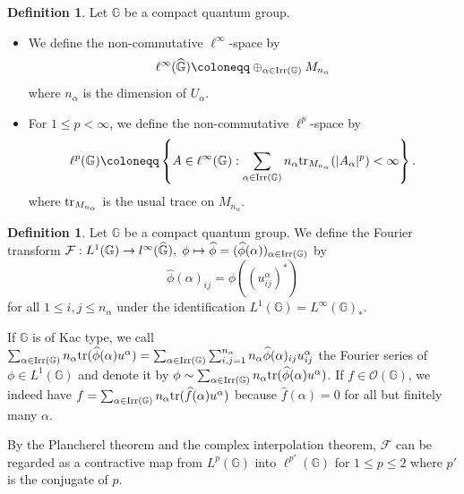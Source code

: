 \documentclass[12pt]{amsart}
\theoremstyle{plain} %
\theoremstyle{definition}
\newtheorem{definition}[equation]{Definition}
\theoremstyle{remark}
\begin{document}
\begin{definition}
Let $\mathbb{G}$ be a compact quantum group.
\begin{itemize}
 \item We define the non-commutative $\ell^{\infty}$-space by
 \[\ell^{\infty}(\widehat{\mathbb{G}})\coloneqq \oplus_{\alpha\in{\rm Irr}(\mathbb{G})} M_{n_{\alpha}}\]
 where $n_{\alpha}$ is the dimension of $U_{\alpha}$.
 \item For $1\leq p<\infty$, we define the non-commutative $\ell^p$-space by
 \[\ell^p(\mathbb{G})\coloneqq\left\{A\in \ell^{\infty}(\mathbb{G}):\sum_{\alpha\in{\rm Irr}(\mathbb{G})}n_{\alpha}{\rm tr}_{M_{n_{\alpha}}}(|A_{\alpha}|^p)<\infty\right\}.\]
 where ${\rm tr}_{M_{n_{\alpha}}}$ is the usual trace on $M_{n_{\alpha}}$.
 \end{itemize}
 \end{definition}
 
 \begin{definition}
Let $\mathbb{G}$ be a compact quantum group.
We define the Fourier transform $\mathcal{F}:L^1(\mathbb{G})\to l^{\infty}(\widehat{\mathbb{G}}),\;\phi\mapsto\widehat{\phi}=(\widehat{\phi}(\alpha))_{\alpha\in{\rm Irr}(\mathbb{G})}$ by
\[\widehat{\phi}(\alpha)_{ij}=\phi((u_{ij}^{\alpha})^*)\]
for all $1\leq i,j\leq n_\alpha$ under the identification $L^1(\mathbb{G})=L^{\infty}(\mathbb{G})_*$.
\end{definition}

If $\mathbb{G}$ is of Kac type, we call 
$\sum_{\alpha\in{\rm Irr}(\mathbb{G})} n_{\alpha}{\rm tr} (\widehat{\phi}(\alpha)u^{\alpha})=\sum_{\alpha\in{\rm Irr}(\mathbb{G})} \sum_{i, j=1}^{n_{\alpha}}n_{\alpha}\widehat{\phi}(\alpha)_{ij}u^{\alpha}_{ij}$
 the Fourier series of $\phi\in L^1(\mathbb{G})$ and denote it by 
 $\phi\sim \sum_{\alpha\in{\rm Irr}(\mathbb{G})} n_{\alpha}{\rm tr} (\widehat{\phi}(\alpha)u^{\alpha})$.
 If $f\in \mathcal{O}(\mathbb{G})$, we indeed have $f= \sum_{\alpha\in{\rm Irr}(\mathbb{G})} n_{\alpha}{\rm tr} (\widehat{f}(\alpha)u^{\alpha})$ because $\widehat{f}(\alpha)=0$ for all but finitely many $\alpha$. 

By the Plancherel theorem and the complex interpolation theorem, $\mathcal{F}$ can be regarded as a contractive map from $L^p(\mathbb{G})$ into $\ell^{p'}(\mathbb{G})$ for $1\leq p\leq2$ where $p'$ is the conjugate of $p$. 
\end{document}
